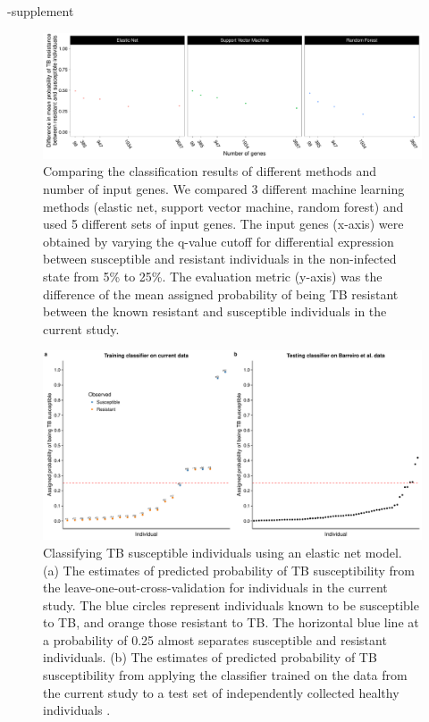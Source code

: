 \documentclass[fleqn,10pt]{wlscirep}
\begin{document}
\begin{filecontents}{\jobname-supplement}
\begin{figure}[ht]
\centering
\includegraphics[width=\linewidth]{../figure/classifier-compare.pdf}
\caption{
Comparing the classification results of different methods and number
of input genes. We compared 3 different machine learning methods
(elastic net, support vector machine, random forest) and used 5
different sets of input genes. The input genes (x-axis) were obtained
by varying the q-value cutoff for differential expression between
susceptible and resistant individuals in the non-infected state from
5\% to 25\%. The evaluation metric (y-axis) was the difference of the
mean assigned probability of being TB resistant between the known
resistant and susceptible individuals in the current study.
}
\label{fig:class-compare}
\end{figure}

\begin{figure}[ht]
\centering
\includegraphics[width=\linewidth]{../figure/classifier-en.pdf}
\caption{
Classifying TB susceptible individuals using an elastic net model. (a)
The estimates of predicted probability of TB susceptibility from the
leave-one-out-cross-validation for individuals in the current study.
The blue circles represent individuals known to be susceptible to TB,
and orange those resistant to TB. The horizontal blue line at a
probability of 0.25 almost separates susceptible and resistant
individuals. (b) The estimates of predicted probability of TB
susceptibility from applying the classifier trained on the data from
the current study to a test set of independently collected healthy
individuals \cite{Barreiro2012}.
}
\label{fig:class-en}
\end{figure}


\end{filecontents}
\end{document}
